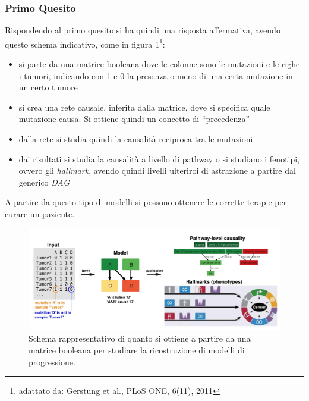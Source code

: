 \documentclass[a4paper,12pt, oneside]{book}
\begin{document}
\subsubsection{Primo Quesito}
Rispondendo al primo quesito si ha quindi una risposta affermativa, avendo
questo schema indicativo, come in figura \ref{fig:q1}\footnote{adattato da:
  Gerstung et al., PLoS ONE, 6(11), 2011}: 
\begin{itemize}
  \item si parte da una matrice booleana dove le colonne sono le mutazioni e le
  righe i tumori, indicando con 1 e 0 la presenza o meno di una certa mutazione
  in un certo tumore
  \item si crea una rete causale, inferita dalla matrice, dove si specifica
  quale mutazione causa. Si ottiene quindi un concetto di ``precedenza''
  \item dalla rete si studia quindi la causalità reciproca tra le mutazioni
  \item dai risultati si studia la causalità a livello di pathway o si studiano
  i fenotipi, ovvero gli \textit{hallmark}, avendo quindi livelli ulteriroi di
  astrazione a partire dal generico \textit{DAG}
\end{itemize}
A partire da questo tipo di modelli si possono ottenere le corrette terapie per
curare un paziente.
\begin{figure}
  \centering
  \includegraphics[scale = 0.185]{img/q1.jpg}
  \caption{Schema rappresentativo di quanto si ottiene a partire da una matrice
    booleana per studiare la ricostruzione di modelli di progressione.}
  \label{fig:q1}
\end{figure}
\end{document}
